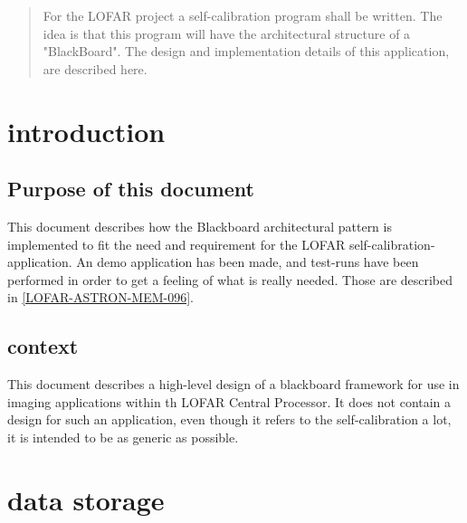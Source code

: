 \documentclass[]{lofar}
\begin{document}
  \maketitle

  \begin{abstract}

    For the LOFAR project a self-calibration program shall be
    written. The idea is that this program will have the architectural
    structure of a "BlackBoard". The design and implementation details
    of this application, are described here.
   
  \end{abstract}

  \section{introduction}
  \label{sec:introduction}\hypertarget{sec:introduction}{}

    \subsection{Purpose of this document}
    \label{subsec:purpose}\hypertarget{subsec:purpose}{}

      This document describes how the Blackboard architectural pattern
      is implemented to fit the need and requirement for the LOFAR
      self-calibration-application. An demo application has been made,
      and test-runs have been performed in order to get a feeling of
      what is really needed. Those are described in
      \hyperlink{bib:LOFAR-ASTRON-MEM-096}{[LOFAR-ASTRON-MEM-096]}.

    \subsection{context}
    \label{subsec:context}\hypertarget{subsec:context}{}

      This document describes a high-level design of a blackboard
      framework for use in imaging applications within th LOFAR Central
      Processor. It does not contain a design for such an application,
      even though it refers to the self-calibration a lot, it is
      intended to be as generic as possible.

  \section{data storage}
  \label{sec:data-storage}\hypertarget{sec:data-storage}{}
\end{document}
